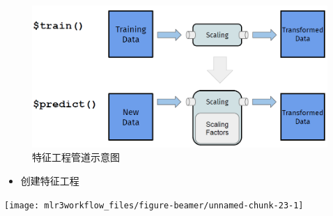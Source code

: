 \documentclass[
  11pt,
  ignorenonframetext,
  dvipsnames,UTF8]{beamer}
\newenvironment{Shaded}{\begin{snugshade}}{\end{snugshade}}
\newcommand{\AttributeTok}[1]{\textcolor[rgb]{0.77,0.63,0.00}{#1}}
\newcommand{\DecValTok}[1]{\textcolor[rgb]{0.00,0.00,0.81}{#1}}
\newcommand{\FunctionTok}[1]{\textcolor[rgb]{0.00,0.00,0.00}{#1}}
\newcommand{\NormalTok}[1]{#1}
\newcommand{\OtherTok}[1]{\textcolor[rgb]{0.56,0.35,0.01}{#1}}
\newcommand{\SpecialCharTok}[1]{\textcolor[rgb]{0.00,0.00,0.00}{#1}}
\newcommand{\StringTok}[1]{\textcolor[rgb]{0.31,0.60,0.02}{#1}}
\providecommand{\tightlist}{%
  \setlength{\itemsep}{0pt}\setlength{\parskip}{0pt}}
\begin{document}
\begin{frame}{}
\protect\hypertarget{section-14}{}
\begin{figure}

{\centering \includegraphics[width=0.75\linewidth]{images/feature_engineering} 

}

\caption{特征工程管道示意图}\label{fig:unnamed-chunk-22}
\end{figure}
\end{frame}

\begin{frame}[fragile]{}
\protect\hypertarget{section-15}{}
\begin{itemize}
\tightlist
\item
  创建特征工程
\end{itemize}

\begin{Shaded}
\end{Shaded}

\begin{center}\texttt{[image: mlr3workflow\_files/figure-beamer/unnamed-chunk-23-1]} \end{center}
\end{frame}
\end{document}
